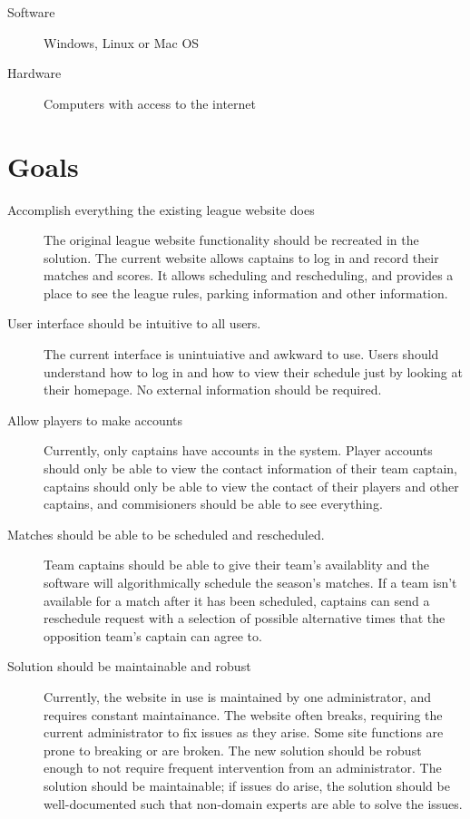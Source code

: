 \documentclass{article}
\begin{document}
\begin{description}
    \item [Software] Windows, Linux or Mac OS
    \item [Hardware] Computers with access to the internet
\end{description}

\section{Goals}

\begin{description}
    \item [Accomplish everything the existing league website does]
    The original league website functionality should be recreated in the
    solution. The current website allows captains to log in and record 
    their matches and scores. It allows scheduling and rescheduling, and
    provides a place to see the league rules, parking information and
    other information.
    
    \item [User interface should be intuitive to all users.] The current
    interface is unintuiative and awkward to use. Users should understand
    how to log in and how to view their schedule just by looking at their
    homepage. No external information should be required.
    \item [Allow players to make accounts] Currently, only captains have
    accounts in the system. Player accounts should only be able to view the
    contact information of their team captain, captains should only be able
    to view the contact of their players and other captains, and commisioners
    should be able to see everything.
    \item [Matches should be able to be scheduled and rescheduled.] 
    Team captains should be able to give their team's availablity and the
    software will algorithmically schedule the season's matches. If a team
    isn't available for a match after it has been scheduled, captains can
    send a reschedule request with a selection of possible alternative times
    that the opposition team's captain can agree to.
    \item [Solution should be maintainable and robust] 
    Currently, the website in use is maintained by one administrator, and
    requires constant maintainance. The website often breaks, requiring 
    the current administrator to fix issues as they arise. Some site 
    functions are prone to breaking or are broken. The new solution should 
    be robust enough to not require frequent intervention from an administrator.
    The solution should be maintainable; if issues do arise, the solution  
    should be well-documented such that non-domain experts are able to 
    solve the issues.
\end{description}
\end{document}
